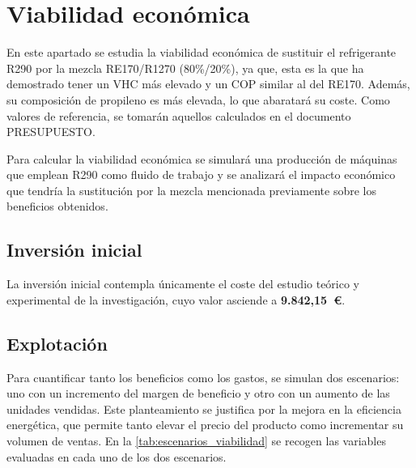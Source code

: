 \documentclass[../main.tex]{subfiles}
\begin{document}
\newpage

\section{Viabilidad económica}

En este apartado se estudia la viabilidad económica de sustituir el refrigerante R290 por la mezcla RE170/R1270 (80\%/20\%), ya que, esta es la que ha demostrado tener un VHC más elevado y un COP similar al del RE170. Además, su composición de propileno es más elevada, lo que abaratará su coste. Como valores de referencia, se tomarán aquellos calculados en el documento PRESUPUESTO.

Para calcular la viabilidad económica se simulará una producción de máquinas que emplean R290 como fluido de trabajo y se analizará el impacto económico que tendría la sustitución por la mezcla mencionada previamente sobre los beneficios obtenidos.

\subsection{Inversión inicial}

La inversión inicial contempla únicamente el coste del estudio teórico y experimental de la investigación, cuyo valor asciende a \textbf{9.842,15~€}.

\subsection{Explotación}

Para cuantificar tanto los beneficios como los gastos, se simulan dos escenarios: uno con un incremento del margen de beneficio y otro con un aumento de las unidades vendidas. Este planteamiento se justifica por la mejora en la eficiencia energética, que permite tanto elevar el precio del producto como incrementar su volumen de ventas. En la \autoref{tab:escenarios_viabilidad} se recogen las variables evaluadas en cada uno de los dos escenarios.
\end{document}
